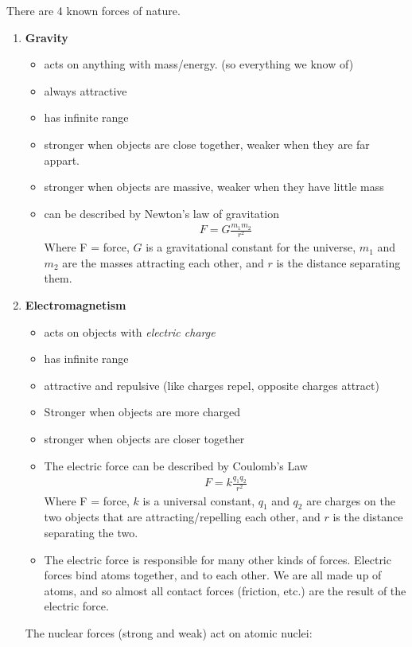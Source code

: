 \documentclass[12pt]{article}
\begin{document}
There are 4 known forces of nature.
\begin{enumerate}
	\item \textbf{Gravity}
		\begin{itemize}
			\item acts on anything with mass/energy. (so everything we know of)
			\item always attractive
			\item has infinite range
			\item stronger when objects are close together, weaker when they are far appart.
			\item stronger when objects are massive, weaker when they have little mass
			\item can be described by Newton's law of gravitation
				\begin{eqnarray}
				F = G \frac{m_1 m_2}{r^2} \nonumber
				\end{eqnarray}
				Where F = force, $G$ is a gravitational constant for the universe, $m_1$ and $m_2$ are the masses attracting each other, and $r$ is the distance separating them.
		\end{itemize}
	\item \textbf{Electromagnetism}
		\begin{itemize}
			\item acts on objects with \textit{electric charge}
			\item has infinite range
			\item attractive and repulsive (like charges repel, opposite charges attract)
			\item Stronger when objects are more charged
			\item stronger when objects are closer together
			\item The electric force can be described by Coulomb's Law
			\begin{eqnarray}
			F = k \frac{q_1 q_2}{r^2} \nonumber
			\end{eqnarray}
			Where F = force, $k$ is a universal constant, $q_1$ and $q_2$ are charges on the two objects that are attracting/repelling each other, and $r$ is the distance separating the two.
			\item The electric force is responsible for many other kinds of forces. Electric forces bind atoms together, and to each other. We are all made up of atoms, and so almost all contact forces (friction, etc.) are the result of the electric force.
		\end{itemize}
	The nuclear forces (strong and weak) act on atomic nuclei:

\end{enumerate}
\end{document}
